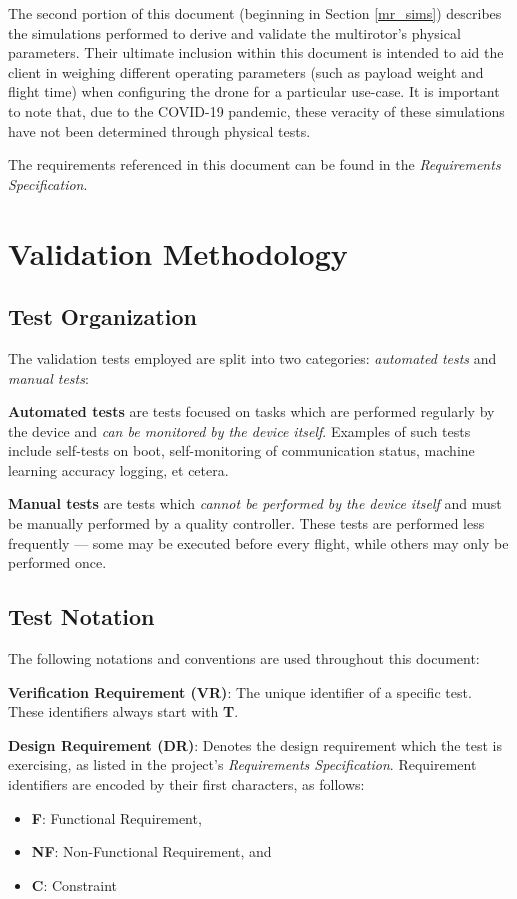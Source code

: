\documentclass[10pt,letterpaper]{article}
\begin{document}
The second portion of this document (beginning in Section \ref{mr_sims}) describes the simulations performed to derive and validate the multirotor's physical parameters. Their ultimate inclusion within this document is intended to aid the client in weighing different operating parameters (such as payload weight and flight time) when configuring the drone for a particular use-case. It is important to note that, due to the COVID-19 pandemic, these veracity of these simulations have not been determined through physical tests.

The requirements referenced in this document can be found in the \textit{Requirements Specification}.

\section{Validation Methodology}

\subsection{Test Organization}\label{auto}
The validation tests employed are split into two categories: \textit{automated tests} and \textit{manual tests}:

\textbf{Automated tests} are tests focused on tasks which are performed regularly by the device and \textit{can be monitored by the device itself}. Examples of such tests include self-tests on boot, self-monitoring of communication status, machine learning accuracy logging, et cetera.

\textbf{Manual tests} are tests which \textit{cannot be performed by the device itself} and must be manually performed by a quality controller. These tests are performed less frequently --- some may be executed before every flight, while others may only be performed once. 

\subsection{Test Notation}
The following notations and conventions are used throughout this document:

\textbf{Verification Requirement (VR)}: The unique identifier of a specific test. These identifiers always start with \textbf{T}.

\textbf{Design Requirement (DR)}: Denotes the design requirement which the test is exercising, as listed in the project's \textit{Requirements Specification}. Requirement identifiers are encoded by their first characters, as follows:
\begin{itemize}
	\item \textbf{F}: Functional Requirement,
	\item \textbf{NF}: Non-Functional Requirement, and
	\item \textbf{C}: Constraint
\end{itemize}
\end{document}
